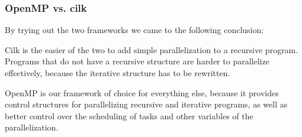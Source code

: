 \subsubsection{OpenMP vs. cilk}
By trying out the two frameworks we came to the following conclusion:

Cilk is the easier of the two to add simple parallelization to a recursive program. Programs that do not have a recursive structure are harder to parallelize effectively, because the iterative structure has to be rewritten. 

OpenMP is our framework of choice for everything else, because it provides control structures for parallelizing recursive and iterative programs, as well as better control over the scheduling of tasks and other variables of the parallelization. 